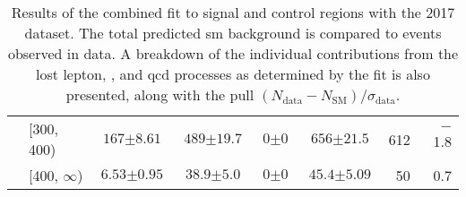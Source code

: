 \begin{table}[htbp]
\begin{tabular*}{\linewidth}{@{\extracolsep{\fill}}llccccrr}
        & [300, 400) &   $\text{167} \pm \text{8.61}$ &    $\text{489} \pm \text{19.7}$ &      $\text{0} \pm \text{0}$ &     $\text{656} \pm \text{21.5}$ &    612 & $-$1.8 \\
        & [400, $\infty$) &    $\text{6.53} \pm \text{0.95}$ &      $\text{38.9} \pm \text{5.0}$ &      $\text{0} \pm \text{0}$ &      $\text{45.4} \pm \text{5.09}$ &     50 & 0.7 \\
       \bottomrule
    \end{tabular*}
    \caption[Results of the combined fit to signal and control regions with the 2017 dataset. The total predicted \acrlong{sm} background is compared to events observed in data]{Results of the combined fit to signal and control regions with the 2017 dataset. The total predicted \acrlong{sm} background is compared to events observed in data. A breakdown of the individual contributions from the lost lepton, \ztonunu, and \acrshort{qcd} processes as determined by the fit is also presented, along with the \gls{pull} $(N_{\mathrm{data}} - N_{\mathrm{SM}})/\sigma_{\mathrm{data}}$.}
    \label{tab:yields_SR_B_only_2017}
\end{table}


